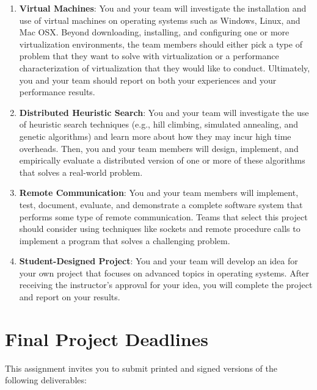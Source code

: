 \begin{enumerate}
  \item {\bf Virtual Machines}: You and your team will investigate the installation and use of virtual machines on
    operating systems such as Windows, Linux, and Mac OSX.  Beyond downloading, installing, and configuring one or more
    virtualization environments, the team members should either pick a type of problem that they want to solve with
    virtualization or a performance characterization of virtualization that they would like to conduct. Ultimately, you
    and your team should report on both your experiences and your performance results.

  \item {\bf Distributed Heuristic Search}: You and your team will investigate the use of heuristic search techniques
    (e.g., hill climbing, simulated annealing, and genetic algorithms) and learn more about how they may incur high time
    overheads. Then, you and your team members will design, implement, and empirically evaluate a distributed version of
    one or more of these algorithms that solves a real-world problem.

  \item {\bf Remote Communication}: You and your team members will implement, test, document, evaluate, and
    demonstrate a complete software system that performs some type of remote communication.  Teams that select this
    project should consider using techniques like sockets and remote procedure calls to implement a program that solves
    a challenging problem.

  \item {\bf Student-Designed Project}: You and your team will develop an idea for your own project that focuses on
    advanced topics in operating systems. After receiving the instructor's approval for your idea, you will complete the
    project and report on your results.

\end{enumerate}



\section*{Final Project Deadlines}

This assignment invites you to submit printed and signed versions of the following deliverables:

